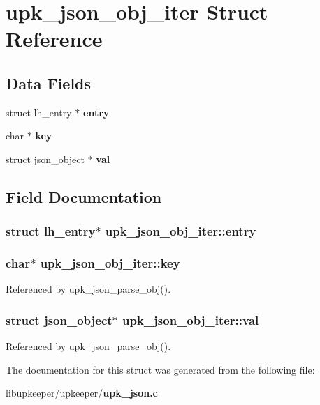\section{upk\_\-json\_\-obj\_\-iter Struct Reference}
\label{structupk__json__obj__iter}
\subsection*{Data Fields}
\begin{DoxyCompactItemize}
\item 
struct lh\_\-entry $\ast$ {\bf entry}
\item 
char $\ast$ {\bf key}
\item 
struct json\_\-object $\ast$ {\bf val}
\end{DoxyCompactItemize}


\subsection{Field Documentation}
\subsubsection[{entry}]{\setlength{\rightskip}{0pt plus 5cm}struct lh\_\-entry$\ast$ {\bf upk\_\-json\_\-obj\_\-iter::entry}}\label{structupk__json__obj__iter_afd8580e29e5e614525f8852533b98c17}
\subsubsection[{key}]{\setlength{\rightskip}{0pt plus 5cm}char$\ast$ {\bf upk\_\-json\_\-obj\_\-iter::key}}\label{structupk__json__obj__iter_ad6f13e7829258a72e71f63789dfb30aa}


Referenced by upk\_\-json\_\-parse\_\-obj().

\subsubsection[{val}]{\setlength{\rightskip}{0pt plus 5cm}struct json\_\-object$\ast$ {\bf upk\_\-json\_\-obj\_\-iter::val}}\label{structupk__json__obj__iter_aa397b0e197851a577c79fb55d1962d36}


Referenced by upk\_\-json\_\-parse\_\-obj().



The documentation for this struct was generated from the following file:\begin{DoxyCompactItemize}
\item 
libupkeeper/upkeeper/{\bf upk\_\-json.c}\end{DoxyCompactItemize}
